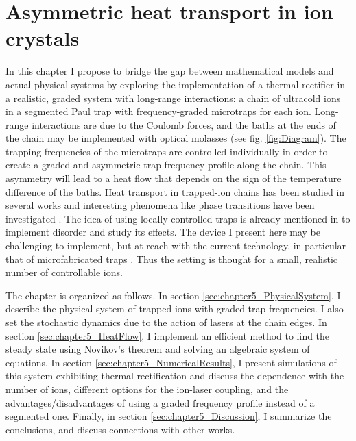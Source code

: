 
\chapter{Asymmetric heat transport in ion crystals}
\label{Chapter5}

In this chapter I propose to bridge the gap between mathematical models and actual physical systems by exploring the implementation of a thermal rectifier in a realistic, graded system with long-range interactions:
a chain of ultracold ions in a segmented Paul trap with frequency-graded microtraps for each ion. Long-range interactions are due to the Coulomb forces, and the baths at the ends of the chain may be implemented with optical molasses (see fig. \ref{fig:Diagram}). The trapping frequencies of the  microtraps are controlled individually in order to create a graded and asymmetric trap-frequency profile along the chain. This asymmetry will lead to a heat flow that depends on the sign of the temperature difference of the baths. Heat transport in trapped-ion chains has been studied in several works  \cite{Freitas2015,Ruiz2014,Ruiz2019,Pruttivarasin2011,Ramm2014} and interesting phenomena like phase transitions have been investigated \cite{Freitas2015,Ruiz2014,Ruiz2019,Pruttivarasin2011}. The idea of using locally-controlled traps is already mentioned in \cite{Freitas2015} to implement disorder and study its effects. The device I present here may be challenging to implement, but at reach with the current technology, in particular  that of microfabricated traps \cite{Cirac2000,Krauth2014,Schmied2009}. Thus the setting is thought for a small, realistic number of controllable ions.

The chapter is organized as follows. In section \ref{sec:chapter5_PhysicalSystem}, I describe the physical system of trapped ions with graded trap frequencies. I also set the stochastic dynamics due to the action of lasers at the chain edges.
In section \ref{sec:chapter5_HeatFlow}, I implement an efficient  method to find the steady state using Novikov's theorem and solving an algebraic system of equations. In section \ref{sec:chapter5_NumericalResults}, I present simulations of this system exhibiting thermal rectification and discuss the dependence with the number of ions, different options for the ion-laser coupling, and the advantages/disadvantages of using a graded frequency profile instead of a segmented one. Finally, in section \ref{sec:chapter5_Discussion}, I summarize the conclusions, and discuss connections with other works.
%
%
